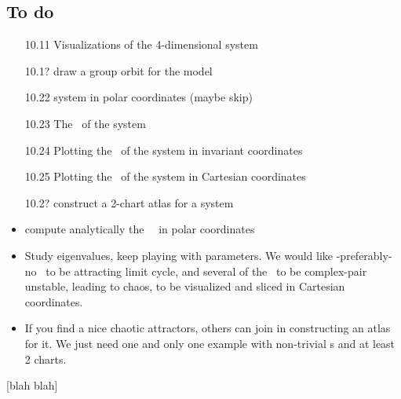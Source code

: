 \documentclass[aip,cha,
reprint,
secnumarabic,
nofootinbib, tightenlines,
nobibnotes, showkeys, showpacs,
groupedaddress,
]{revtex4-1}
\begin{document}
\subsection{To do}
\label{s:ToDo}

\begin{itemize}
  \item[10.11] Visualizations of the 4-dimensional {\twoMode} system
  \item[10.1?] draw a group orbit for the {\twoMode} model
  \item[10.22] {\twoMode} system in polar coordinates (maybe skip)
  \item[10.23] The \reqva\ of the {\twoMode} system
  \item[10.24] Plotting the \reqva\ of
           the {\twoMode} system in invariant coordinates
  \item[10.25] Plotting the \reqva\ of
           the {\twoMode} system in Cartesian coordinates
  \item[10.2?] construct a 2-chart atlas
            for a {\twoMode} system
  \item
        compute analytically the \stabmat\ \Mvar\ in polar coordinates
  \item
        Study eigenvalues, keep playing with parameters. We would like
        -preferably- no \reqv\ to be attracting limit cycle, and several of
        the \reqva\ to be complex-pair unstable, leading to chaos, to be
        visualized and sliced in Cartesian coordinates.
  \item
        If you find a nice chaotic attractors, others can join in
        constructing an atlas for it. We just need one and only one
        example with non-trivial \chartBord s and at least 2 charts.
\end{itemize}

 [blah blah]
\end{document}
